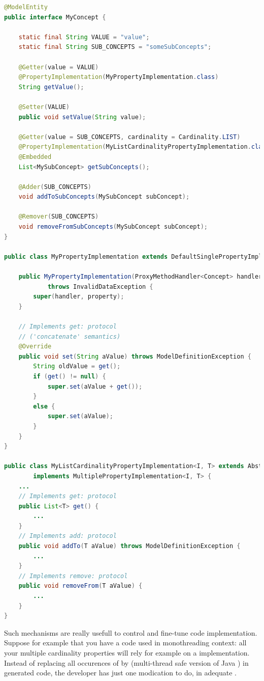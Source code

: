 \begin{lstlisting}[language=Java,basicstyle=\ttfamily\footnotesize]
@ModelEntity
public interface MyConcept {

	static final String VALUE = "value";
	static final String SUB_CONCEPTS = "someSubConcepts";

	@Getter(value = VALUE)
	@PropertyImplementation(MyPropertyImplementation.class)
	String getValue();

	@Setter(VALUE)
	public void setValue(String value);

	@Getter(value = SUB_CONCEPTS, cardinality = Cardinality.LIST)
	@PropertyImplementation(MyListCardinalityPropertyImplementation.class)
	@Embedded
	List<MySubConcept> getSubConcepts();

	@Adder(SUB_CONCEPTS)
	void addToSubConcepts(MySubConcept subConcept);

	@Remover(SUB_CONCEPTS)
	void removeFromSubConcepts(MySubConcept subConcept);
}

public class MyPropertyImplementation extends DefaultSinglePropertyImplementation<Concept, String> {

	public MyPropertyImplementation(ProxyMethodHandler<Concept> handler, ModelProperty<Concept> property)
			throws InvalidDataException {
		super(handler, property);
	}

    // Implements get: protocol
    // ('concatenate' semantics)
	@Override
	public void set(String aValue) throws ModelDefinitionException {
		String oldValue = get();
		if (get() != null) {
			super.set(aValue + get());
		}
		else {
			super.set(aValue);
		}
	}
}

public class MyListCardinalityPropertyImplementation<I, T> extends AbstractPropertyImplementation<I, List<T>>
		implements MultiplePropertyImplementation<I, T> {
	...
	// Implements get: protocol
	public List<T> get() {
		...
	}
	// Implements add: protocol
	public void addTo(T aValue) throws ModelDefinitionException {
		...
	}
	// Implements remove: protocol
	public void removeFrom(T aValue) {
		...
	}
}
\end{lstlisting}

Such mechanisms are really usefull to control and fine-tune code implementation. Suppose for example that you have a code used in monothreading context: all your multiple cardinality properties will rely for example on a  implementation. Instead of replacing all occurences of  by  (multi-thread safe version of Java ) in generated code, the developer has just one modication to do, in adequate .

